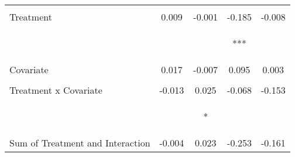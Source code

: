 \begin{tabular}{lcccc}
 & \begin{footnotesize}\end{footnotesize} & \begin{footnotesize}\end{footnotesize} & \begin{footnotesize}\end{footnotesize} & \begin{footnotesize}\end{footnotesize}\\
\noalign{\smallskip}Treatment & 0.009 & -0.001 & -0.185 & -0.008\\
 & \begin{footnotesize}[0.011]\end{footnotesize} & \begin{footnotesize}[0.005]\end{footnotesize} & \begin{footnotesize}[0.051]***\end{footnotesize} & \begin{footnotesize}[0.050]\end{footnotesize}\\
\noalign{\smallskip}Covariate & 0.017 & -0.007 & 0.095 & 0.003\\
 & \begin{footnotesize}[0.024]\end{footnotesize} & \begin{footnotesize}[0.015]\end{footnotesize} & \begin{footnotesize}[0.131]\end{footnotesize} & \begin{footnotesize}[0.128]\end{footnotesize}\\
\noalign{\smallskip}Treatment x Covariate & -0.013 & 0.025 & -0.068 & -0.153\\
 & \begin{footnotesize}[0.026]\end{footnotesize} & \begin{footnotesize}[0.013]*\end{footnotesize} & \begin{footnotesize}[0.143]\end{footnotesize} & \begin{footnotesize}[0.138]\end{footnotesize}\\
\noalign{\smallskip}Sum of Treatment and Interaction & -0.004 & 0.023 & -0.253 & -0.161\\

\end{tabular}
